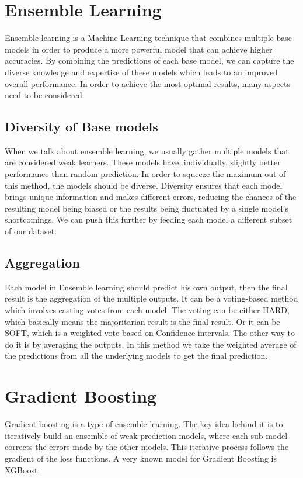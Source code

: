 \documentclass[a4paper,12pt,twoside]{report}
\begin{document}
\section{Ensemble Learning}
Ensemble learning is a Machine Learning technique that combines multiple base models in order to produce a more powerful model that can achieve higher accuracies. By combining the predictions of each base model, we can capture the diverse knowledge and expertise of these models which leads to an improved overall performance. In order to achieve the most optimal results, many aspects need to be considered:
\subsection{Diversity of Base models}
When we talk about ensemble learning, we usually gather multiple models that are considered weak learners. These models have, individually, slightly better performance than random prediction. In order to squeeze the maximum out of this method, the models should be diverse. Diversity ensures that each model brings unique information and makes different errors, reducing the chances of the resulting model being biased or the results being fluctuated by a single model's shortcomings. We can push this further by feeding each model a different subset of our dataset.
\subsection{Aggregation}
Each model in Ensemble learning should predict his own output, then the final result is the aggregation of the multiple outputs. It can be a voting-based method which involves casting votes from each model. The voting can be either HARD, which basically means the majoritarian result is the final result. Or it can be SOFT, which is a weighted vote based on Confidence intervals.
The other way to do it is by averaging the outputs. In this method we take the weighted average of the predictions from all the underlying models to get the final prediction.
\section{Gradient Boosting}
Gradient boosting is a type of ensemble learning. The key idea behind it is to iteratively build an ensemble of weak prediction models, where each sub model corrects the errors made by the other models. This iterative process follows the gradient of the loss functions.
A very known model for Gradient Boosting is XGBoost:
\end{document}

